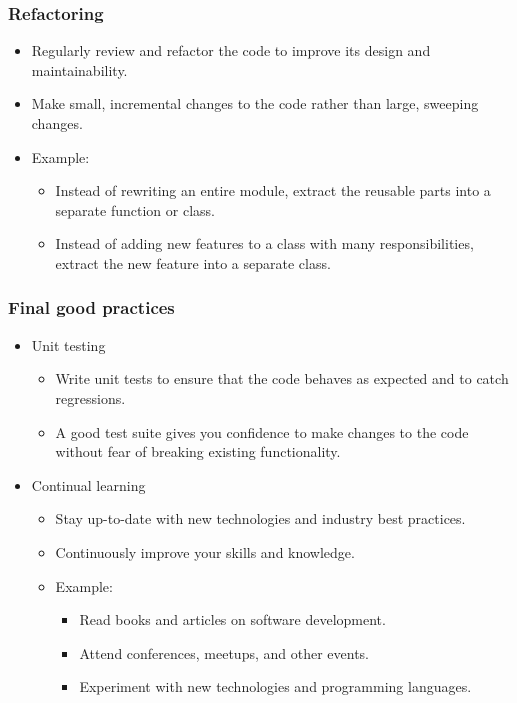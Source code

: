 \documentclass{beamer}
\begin{document}
\begin{frame}[fragile]
\frametitle{Refactoring}

\begin{itemize}
\item Regularly review and refactor the code to improve its design and maintainability.
\item Make small, incremental changes to the code rather than large, sweeping changes.
\item Example:
\begin{itemize}
\item Instead of rewriting an entire module, extract the reusable parts into a separate function or class.
\item Instead of adding new features to a class with many responsibilities, extract the new feature into a separate class.
\end{itemize}
\end{itemize}
\end{frame}

\begin{frame}[fragile]
\frametitle{Final good practices}

\begin{itemize}
\item 
Unit testing
\begin{itemize}
\item Write unit tests to ensure that the code behaves as expected and to catch regressions.
\item A good test suite gives you confidence to make changes to the code without fear of breaking existing functionality.
\end{itemize}
\item 
Continual learning
\begin{itemize}
\item Stay up-to-date with new technologies and industry best practices.
\item Continuously improve your skills and knowledge.
\item Example:
\begin{itemize}
\item Read books and articles on software development.
\item Attend conferences, meetups, and other events.
\item Experiment with new technologies and programming languages.
\end{itemize}
\end{itemize}
\end{itemize}
\end{frame}
\end{document}
